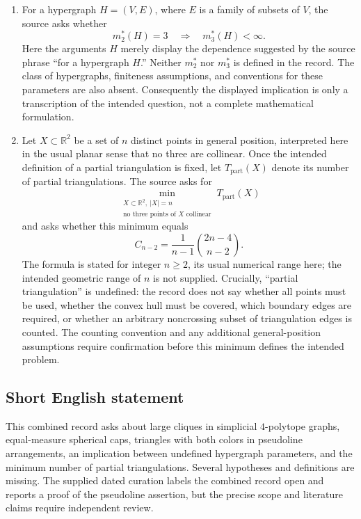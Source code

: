 \documentclass[11pt]{article}
\newcommand{\R}{\mathbb{R}}
\begin{document}
\begin{enumerate}
These definitions give a conventional interpretation, but the source does not specify the affine or projective setting, finiteness, minimum size, or whether both colors must occur. The unrestricted formulation includes monochromatic arrangements and arrangements with fewer than three pseudolines, so it cannot be an affirmative universal assertion as written. Even requiring both colors leaves two-pseudoline arrangements without a triangular face. The intended hypotheses must be recovered before identifying this question with the theorem mentioned in the supplied literature assessment.

\item For a hypergraph \(H=(V,E)\), where \(E\) is a family of subsets of \(V\), the source asks whether
\[
m_2^*(H)=3\quad\Longrightarrow\quad m_3^*(H)<\infty.
\]
Here the arguments \(H\) merely display the dependence suggested by the source phrase ``for a hypergraph \(H\).'' Neither \(m_2^*\) nor \(m_3^*\) is defined in the record. The class of hypergraphs, finiteness assumptions, and conventions for these parameters are also absent. Consequently the displayed implication is only a transcription of the intended question, not a complete mathematical formulation.

\item Let \(X\subset\R^2\) be a set of \(n\) distinct points in general position, interpreted here in the usual planar sense that no three are collinear. Once the intended definition of a partial triangulation is fixed, let \(T_{\mathrm{part}}(X)\) denote its number of partial triangulations. The source asks for
\[
\min_{\substack{X\subset\R^2,\ |X|=n\\\text{no three points of }X\text{ collinear}}}
T_{\mathrm{part}}(X)
\]
and asks whether this minimum equals
\[
C_{n-2}=\frac{1}{n-1}\binom{2n-4}{n-2}.
\]
The formula is stated for integer \(n\ge2\), its usual numerical range here; the intended geometric range of \(n\) is not supplied. Crucially, ``partial triangulation'' is undefined: the record does not say whether all points must be used, whether the convex hull must be covered, which boundary edges are required, or whether an arbitrary noncrossing subset of triangulation edges is counted. The counting convention and any additional general-position assumptions require confirmation before this minimum defines the intended problem.
\end{enumerate}
\subsection{Short English statement}
This combined record asks about large cliques in simplicial \(4\)-polytope graphs, equal-measure spherical caps, triangles with both colors in pseudoline arrangements, an implication between undefined hypergraph parameters, and the minimum number of partial triangulations. Several hypotheses and definitions are missing. The supplied dated curation labels the combined record open and reports a proof of the pseudoline assertion, but the precise scope and literature claims require independent review.
\end{document}
